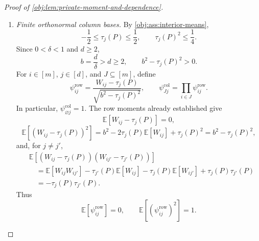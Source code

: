 \documentclass[11pt]{article}
\begin{document}
\begin{proof}[Proof of \cref{obj:lem:private-moment-and-dependence}]
\begin{enumerate}
Fix \(J\in\mathcal J_k\). All moment weights are nonnegative, and the
subset \(J_{\mathrm{sub}}=J\cap J'\) is one of the terms in
\[
b^{2|J\cap J'|}
\bigl(\tau_j(P)^2\bigr)^{k-|J\cap J'|}
\le
\sum_{J_{\mathrm{sub}}\subseteq J\cap J'}
b^{2|J_{\mathrm{sub}}|}
\bigl(\tau_j(P)^2\bigr)^{k-|J_{\mathrm{sub}}|}.
\]
Summing over \(J'\), interchanging the finite sums, and applying the
inclusion count bound gives
\[
\begin{aligned}
&\sum_{J'\in\mathcal J_k}
b^{2|J\cap J'|}
\bigl(\tau_j(P)^2\bigr)^{k-|J\cap J'|}\\
&\quad\le
\sum_{J_{\mathrm{sub}}\subseteq J}
b^{2|J_{\mathrm{sub}}|}
\bigl(\tau_j(P)^2\bigr)^{k-|J_{\mathrm{sub}}|}
\#\{J'\in\mathcal J_k:J_{\mathrm{sub}}\subseteq J'\}\\
&\quad\le
\binom mk
\sum_{J_{\mathrm{sub}}\subseteq J}
\left(\frac{2kb^2}{m}\right)^{|J_{\mathrm{sub}}|}
\bigl(\tau_j(P)^2\bigr)^{k-|J_{\mathrm{sub}}|}\\
&\quad=
\binom mk
\sum_{v=0}^k\binom kv
\left(\frac{2kb^2}{m}\right)^v
\bigl(\tau_j(P)^2\bigr)^{k-v}\\
&\quad=
\binom mk
\left(\tau_j(P)^2+\frac{2kb^2}{m}\right)^k.
\end{aligned}
\]
The penultimate equality counts the \(v\)-subsets of \(J\), and the final
equality is the binomial expansion. Averaging this row bound over
\(J\in\mathcal J_k\) proves
\[
\begin{aligned}
\mathbb E[\mathsf U_{kj}^2]
&\le
\binom mk^{-2}\binom mk\binom mk
\left(\tau_j(P)^2+\frac{2kb^2}{m}\right)^k\\
&=
\left(\tau_j(P)^2+\frac{2kb^2}{m}\right)^k.
\end{aligned}
\]

\item \textit{Finite orthonormal column bases.}
By \cref{obj:ass:interior-means},
\[
-\frac12\le\tau_j(P)\le\frac12,
\qquad
\tau_j(P)^2\le\frac14.
\]
Since \(0<\delta<1\) and \(d\ge2\),
\[
b=\frac d\delta>d\ge2,
\qquad
b^2-\tau_j(P)^2>0.
\]
For \(i\in[m]\), \(j\in[d]\), and \(J\subseteq[m]\), define
\[
\psi^{\mathrm{row}}_{ij}
=
\frac{W_{ij}-\tau_j(P)}
{\sqrt{b^2-\tau_j(P)^2}},
\qquad
\psi^{\mathrm{col}}_{Jj}
=
\prod_{i\in J}\psi^{\mathrm{row}}_{ij}.
\]
In particular, \(\psi^{\mathrm{col}}_{\varnothing j}=1\).
The row moments already established give
\[
\mathbb E[W_{ij}-\tau_j(P)]=0,
\]
\[
\mathbb E[(W_{ij}-\tau_j(P))^2]
=
b^2-2\tau_j(P)\mathbb E[W_{ij}]+\tau_j(P)^2
=
b^2-\tau_j(P)^2,
\]
and, for \(j\ne j'\),
\[
\begin{aligned}
&\mathbb E[(W_{ij}-\tau_j(P))(W_{ij'}-\tau_{j'}(P))]\\
&\quad=
\mathbb E[W_{ij}W_{ij'}]
-\tau_{j'}(P)\mathbb E[W_{ij}]
-\tau_j(P)\mathbb E[W_{ij'}]
+\tau_j(P)\tau_{j'}(P)\\
&\quad=-\tau_j(P)\tau_{j'}(P).
\end{aligned}
\]
Thus
\[
\mathbb E[\psi^{\mathrm{row}}_{ij}]=0,
\qquad
\mathbb E[(\psi^{\mathrm{row}}_{ij})^2]=1.
\]


\end{enumerate}
\end{proof}
\end{document}
